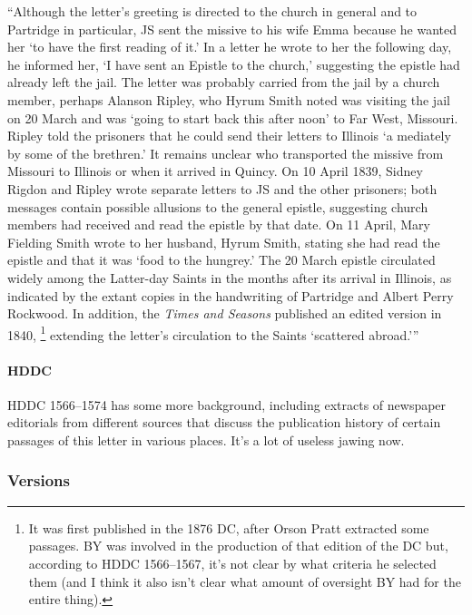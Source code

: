 			``Although the letter's greeting is directed to the church in general and to Partridge in particular, JS sent the missive to his wife Emma because he wanted her `to have the first reading of it.' In a letter he wrote to her the following day, he informed her, `I have sent an Epistle to the church,' suggesting the epistle had already left the jail. The letter was probably carried from the jail by a church member, perhaps Alanson Ripley, who Hyrum Smith noted was visiting the jail on 20 March and was `going to start back this after noon' to Far West, Missouri. Ripley told the prisoners that he could send their letters to Illinois `a mediately by some of the brethren.' It remains unclear who transported the missive from Missouri to Illinois or when it arrived in Quincy. On 10 April 1839, Sidney Rigdon and Ripley wrote separate letters to JS and the other prisoners; both messages contain possible allusions to the general epistle, suggesting church members had received and read the epistle by that date. On 11 April, Mary Fielding Smith wrote to her husband, Hyrum Smith, stating she had read the epistle and that it was `food to the hungrey.' The 20 March epistle circulated widely among the Latter-day Saints in the months after its arrival in Illinois, as indicated by the extant copies in the handwriting of Partridge and Albert Perry Rockwood. In addition, the \textit{Times and Seasons} published an edited version in 1840,%
				\footnote{%
					It was first published in the 1876 DC, after Orson Pratt extracted some passages. BY was involved in the production of that edition of the DC but, according to HDDC 1566--1567, it's not clear by what criteria he selected them (and I think it also isn't clear what amount of oversight BY had for the entire thing).
					}
			extending the letter's circulation to the Saints `scattered abroad.'''
			
		\paragraph{HDDC} 
		
			HDDC 1566--1574 has some more background, including extracts of newspaper editorials from different sources that discuss the publication history of certain passages of this letter in various places. It's a lot of useless jawing now.
			
	\subsubsection{Versions}
		\label{DC121-V}
		
